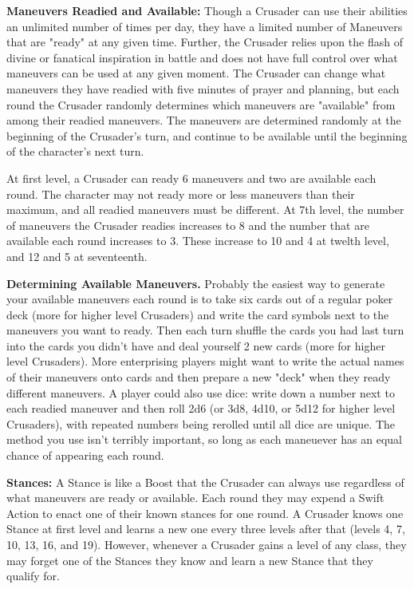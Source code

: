 \textbf{Maneuvers Readied and Available:} Though a Crusader can use their abilities an unlimited number of times per day, they have a limited number of Maneuvers that are "ready" at any given time. Further, the Crusader relies upon the flash of divine or fanatical inspiration in battle and does not have full control over what maneuvers can be used at any given moment. The Crusader can change what maneuvers they have readied with five minutes of prayer and planning, but each round the Crusader randomly determines which maneuvers are "available" from among their readied maneuvers. The maneuvers are determined randomly at the beginning of the Crusader's turn, and continue to be available until the beginning of the character's next turn.

At first level, a Crusader can ready 6 maneuvers and two are available each round. The character may not ready more or less maneuvers than their maximum, and all readied maneuvers must be different. At 7th level, the number of maneuvers the Crusader readies increases to 8 and the number that are available each round increases to 3. These increase to 10 and 4 at twelth level, and 12 and 5 at seventeenth.

\textbf{Determining Available Maneuvers.} Probably the easiest way to generate your available maneuvers each round is to take six cards out of a regular poker deck (more for higher level Crusaders) and write the card symbols next to the maneuvers you want to ready. Then each turn shuffle the cards you had last turn into the cards you didn't have and deal yourself 2 new cards (more for higher level Crusaders). More enterprising players might want to write the actual names of their maneuvers onto cards and then prepare a new "deck" when they ready different maneuvers. A player could also use dice: write down a number next to each readied maneuver and then roll 2d6 (or 3d8, 4d10, or 5d12 for higher level Crusaders), with repeated numbers being rerolled until all dice are unique. The method you use isn't terribly important, so long as each maneuever has an equal chance of appearing each round.

\textbf{Stances:} A Stance is like a Boost that the Crusader can always use regardless of what maneuvers are ready or available. Each round they may expend a Swift Action to enact one of their known stances for one round. A Crusader knows one Stance at first level and learns a new one every three levels after that (levels 4, 7, 10, 13, 16, and 19). However, whenever a Crusader gains a level of any class, they may forget one of the Stances they know and learn a new Stance that they qualify for.

